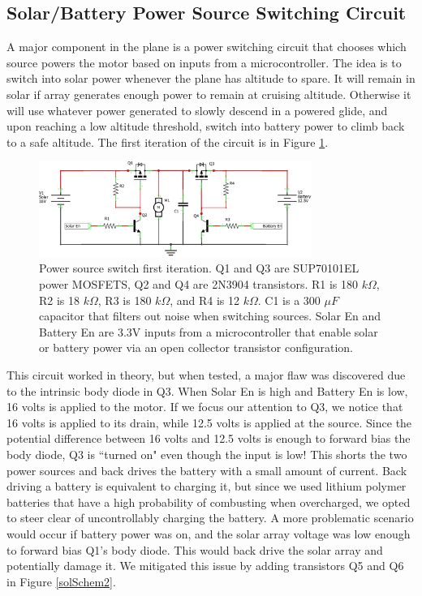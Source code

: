 \documentclass[12pt,journal,compsoc]{IEEEtran}
\begin{document}
\subsection{Solar/Battery Power Source Switching Circuit}
A major component in the plane is a power switching circuit that chooses which source powers the motor based on inputs from a microcontroller. The idea is to switch into solar power whenever the plane has altitude to spare. It will remain in solar if array generates enough power to remain at cruising altitude. Otherwise it will use whatever power generated to slowly descend in a powered glide, and upon reaching a low altitude threshold, switch into battery power to climb back to a safe altitude. The first iteration of the circuit is in Figure \ref{solSchem1}.
\begin{figure}[h!]
\hspace*{0cm}
\centering
\includegraphics[width=3.5in]{solar_circuit2_schem.png}
\caption{Power source switch first iteration. Q1 and Q3 are SUP70101EL power MOSFETS, Q2 and Q4 are 2N3904 transistors. R1 is 180 $k\Omega$, R2 is 18 $k\Omega$, R3 is 180 $k\Omega$, and R4 is 12 $k\Omega$. C1 is a 300 $\mu F$ capacitor that filters out noise when switching sources. Solar En and Battery En are 3.3V inputs from a microcontroller that enable solar or battery power via an open collector transistor configuration.}
\label{solSchem1}
\end{figure}
This circuit worked in theory, but when tested, a major flaw was discovered due to the intrinsic body diode in Q3. When Solar En is high and Battery En is low, 16 volts is applied to the motor. If we focus our attention to Q3, we notice that 16 volts is applied to its drain, while 12.5 volts is applied at the source. Since the potential difference between 16 volts and 12.5 volts is enough to forward bias the body diode, Q3 is ``turned on" even though the input is low! This shorts the two power sources and back drives the battery with a small amount of current. Back driving a battery is equivalent to charging it, but since we used lithium polymer batteries that have a high probability of combusting when overcharged, we opted to steer clear of uncontrollably charging the battery. A more problematic scenario would occur if battery power was on, and the solar array voltage was low enough to forward bias Q1's body diode. This would back drive the solar array and potentially damage it. We mitigated this issue by adding transistors Q5 and Q6 in Figure \ref{solSchem2}.
\end{document}
